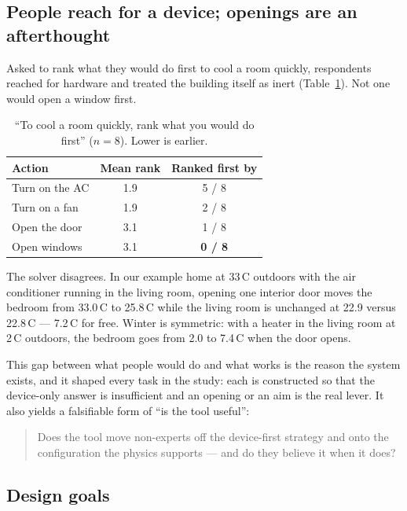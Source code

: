 \documentclass[manuscript,review,anonymous]{acmart}
\begin{document}
\subsection{People reach for a device; openings are an afterthought}

Asked to rank what they would do first to cool a room quickly, respondents
reached for hardware and treated the building itself as inert
(Table~\ref{tab:formative}). Not one would open a window first.

\begin{table}[t]
  \caption{``To cool a room quickly, rank what you would do first'' ($n=8$).
    Lower is earlier.}
  \label{tab:formative}
  \small
  \begin{tabular}{lcc}
    \toprule
    Action & Mean rank & Ranked first by \\
    \midrule
    Turn on the AC   & 1.9 & 5 / 8 \\
    Turn on a fan    & 1.9 & 2 / 8 \\
    Open the door    & 3.1 & 1 / 8 \\
    Open windows     & 3.1 & \textbf{0 / 8} \\
    \bottomrule
  \end{tabular}
\end{table}

The solver disagrees. In our example home at 33\,\textdegree C outdoors with the
air conditioner running in the living room, opening one interior door moves the
bedroom from 33.0\,\textdegree C to 25.8\,\textdegree C while the living room is
unchanged at 22.9 versus 22.8\,\textdegree C --- 7.2\,\textdegree C for free.
Winter is symmetric: with a heater in the living room at 2\,\textdegree C
outdoors, the bedroom goes from 2.0 to 7.4\,\textdegree C when the door opens.

This gap between what people would do and what works is the reason the system
exists, and it shaped every task in the study: each is constructed so that the
device-only answer is insufficient and an opening or an aim is the real lever.
It also yields a falsifiable form of ``is the tool useful'':

\begin{quote}
  Does the tool move non-experts off the device-first strategy and onto the
  configuration the physics supports --- and do they believe it when it does?
\end{quote}

\subsection{Design goals}
\end{document}

